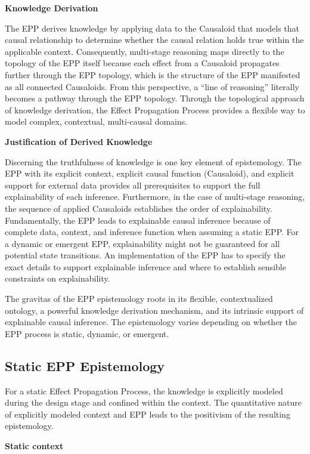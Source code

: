 \textbf{Knowledge Derivation}

The EPP derives knowledge by applying data to the Causaloid that models that causal relationship to determine whether the causal relation holds true within the applicable context. Consequently, multi-stage reasoning maps directly to the topology of the EPP itself because each effect from a Causaloid propagates further through the EPP topology, which is the structure of the EPP manifested as all connected Causaloids.
From this perspective, a “line of reasoning” literally becomes a pathway through the EPP topology. Through the topological approach of knowledge derivation, the Effect Propagation Process provides a flexible way to model complex, contextual, multi-causal domains.

\textbf{Justification of Derived Knowledge}

Discerning the truthfulness of knowledge is one key element of epistemology. The EPP with its explicit context, explicit causal function (Causaloid), and explicit support for external data provides all prerequisites to support the full explainability of each inference. Furthermore, in the case of multi-stage reasoning, the sequence of applied Causaloids establishes the order of explainability.
Fundamentally, the EPP leads to explainable causal inference because of complete data, context, and inference function when assuming a static EPP. For a dynamic or emergent EPP, explainability might not be guaranteed for all potential state transitions. An implementation of the EPP has to specify the exact details to support explainable inference and where to establish sensible constraints on explainability.

The gravitas of the EPP epistemology roots in its flexible, contextualized ontology, a powerful knowledge derivation mechanism, and its intrinsic support of explainable causal inference. The epistemology varies depending on whether the EPP process is static, dynamic, or emergent.

\subsection{Static EPP Epistemology}

For a static Effect Propagation Process, the knowledge is explicitly modeled during the design stage and confined within the context. The quantitative nature of explicitly modeled context and EPP leads to the positivism of the resulting epistemology.

\textbf{Static context}

